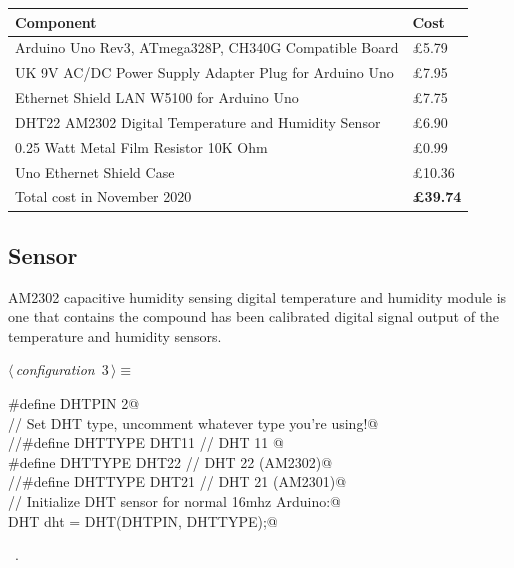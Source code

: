 \documentclass[a4paper, 12pt]{article}
\begin{document}
\begin{tabular}{ll}
  \textbf{Component} & \textbf{Cost} \\ 
  \hline
  Arduino Uno Rev3, ATmega328P, CH340G Compatible Board & \pounds 5.79 \\
  UK 9V AC/DC Power Supply Adapter Plug for Arduino Uno & \pounds 7.95 \\
  Ethernet Shield LAN W5100 for Arduino Uno & \pounds 7.75 \\
  DHT22 AM2302 Digital Temperature and Humidity Sensor & \pounds 6.90 \\
  0.25 Watt Metal Film Resistor 10K Ohm & \pounds 0.99 \\
  Uno Ethernet Shield Case & \pounds 10.36 \\
  \hline
  Total cost in November 2020 & \textbf{\pounds 39.74}  \\
\end{tabular}

\subsection{Sensor}

AM2302 capacitive humidity sensing digital temperature and humidity module is one that contains the
compound has been calibrated digital signal output of the temperature and humidity sensors. 

\begin{flushleft} \small
\begin{minipage}{\linewidth}\label{scrap1}\raggedright\small
{}$\langle\,${\itshape configuration}\nobreak\ {\footnotesize{3}}$\,\rangle\equiv$
\vspace{-1ex}
\begin{list}{}{\setlength{\leftmargin}{1em}} \item
\mbox{}\verb@  #define DHTPIN 2@\\
\mbox{}\verb@  // Set DHT type, uncomment whatever type you're using!@\\
\mbox{}\verb@  //#define DHTTYPE DHT11   // DHT 11 @\\
\mbox{}\verb@  #define DHTTYPE DHT22   // DHT 22  (AM2302)@\\
\mbox{}\verb@  //#define DHTTYPE DHT21   // DHT 21 (AM2301)@\\
\mbox{}\verb@  // Initialize DHT sensor for normal 16mhz Arduino:@\\
\mbox{}\verb@  DHT dht = DHT(DHTPIN, DHTTYPE);@\\
\mbox{}{\NWsep}
\end{list}
\vspace{-1ex}
\vspace{-1ex}
\footnotesize
\begin{list}{}{\setlength{\itemsep}{-\parsep}\setlength{\itemindent}{-\leftmargin}}
\item \NWtxtMacroRefIn\ .
\end{list}
\end{minipage}
\end{flushleft}
\end{document}
